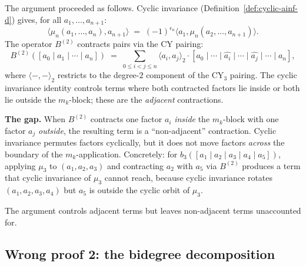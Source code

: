 \begin{remark}
\label{rem:cyclic-argument-fails}
The argument proceeded as follows. Cyclic invariance
(Definition~\ref{def:cyclic-ainf-d}) gives, for all
$a_1, \ldots, a_{n+1}$:
\[
 \langle \mu_n(a_1, \ldots, a_n), a_{n+1} \rangle
 \;=\; (-1)^{\epsilon_n}
 \langle a_1, \mu_n(a_2, \ldots, a_{n+1}) \rangle.
\]
The operator $B^{(2)}$ contracts pairs via the CY pairing:
\[
 B^{(2)}([a_0 \mid a_1 \mid \cdots \mid a_n])
 \;=\; \sum_{0 \leq i < j \leq n}
 \langle a_i, a_j \rangle_2 \cdot
 [a_0 \mid \cdots \mid \widehat{a_i} \mid \cdots
 \mid \widehat{a_j} \mid \cdots \mid a_n],
\]
where $\langle -, - \rangle_2$ restricts to the degree-$2$
component of the CY$_3$ pairing. The cyclic invariance
identity controls terms where both contracted factors lie inside
or both lie outside the $m_k$-block; these are the
\emph{adjacent} contractions.

\textbf{The gap.} When $B^{(2)}$ contracts one factor $a_i$
\emph{inside} the $m_k$-block with one factor $a_j$
\emph{outside}, the resulting term is a ``non-adjacent''
contraction. Cyclic invariance permutes factors cyclically, but
it does not move factors \emph{across} the boundary of the
$m_k$-application. Concretely: for
$b_3([a_1 \mid a_2 \mid a_3 \mid a_4 \mid a_5])$,
applying $\mu_3$ to $(a_1, a_2, a_3)$ and contracting $a_2$
with $a_5$ via $B^{(2)}$ produces a term that cyclic invariance
of $\mu_3$ cannot reach, because cyclic invariance rotates
$(a_1, a_2, a_3, a_4)$ but $a_5$ is outside the cyclic orbit
of $\mu_3$.

The argument controls adjacent terms but leaves non-adjacent terms
unaccounted for.
\end{remark}


\subsection{Wrong proof 2: the bidegree decomposition}
\label{subsec:wrong-bidegree}

